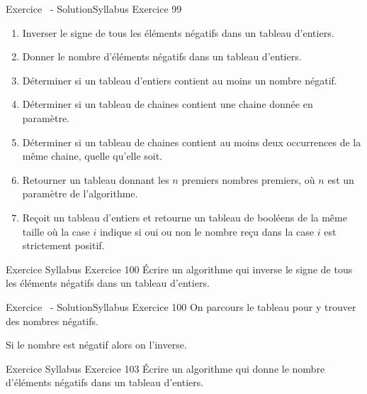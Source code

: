 \begin{frame}[allowframebreaks]{Exercice \theexercice~- Solution}{Syllabus Exercice 99}
    \begin{enumerate}
        \item
        Inverser le signe de tous les éléments négatifs dans un tableau d’entiers.
        
        \item
        Donner le nombre d’éléments négatifs dans un tableau d’entiers.
        
        \item
        Déterminer si un tableau d’entiers contient au moins un nombre négatif.
        
        \item
        Déterminer si un tableau de chaines contient
        une chaine donnée en paramètre.
        
        \item
        Déterminer si un tableau de chaines contient
        au moins deux occurrences de la même chaine,
        quelle qu’elle soit.
        
        \item
        Retourner un tableau donnant les $n$ premiers nombres premiers,
        où $n$ est un paramètre de l’algorithme.
        
        \item
        Reçoit un tableau d’entiers
        et retourne un tableau de booléens de la même taille
        où la case $i$ indique si oui ou non
        le nombre reçu dans la case $i$ est strictement positif.
        
    \end{enumerate}

\end{frame}

\begin{frame}{Exercice \theexercice}{Syllabus Exercice 100}
    Écrire un algorithme qui
    inverse le signe de tous les éléments négatifs dans un tableau d’entiers.
\end{frame}

\begin{frame}{Exercice \theexercice~- Solution}{Syllabus Exercice 100}
    On parcours le tableau pour y trouver des nombres négatifs.
    
    Si le nombre est négatif alors on l'inverse.
\end{frame}

\begin{frame}{Exercice \theexercice}{Syllabus Exercice 103}
    Écrire un algorithme qui
    donne le nombre d’éléments négatifs dans un tableau d’entiers.
\end{frame}

